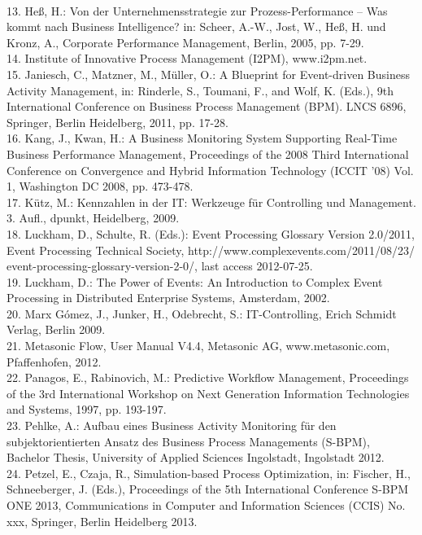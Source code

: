 \\
13.	Heß, H.: Von der Unternehmensstrategie zur Prozess-Performance – Was kommt nach Business Intelligence? in: Scheer, A.-W., Jost, W., Heß, H. und Kronz, A., Corporate Performance Management, Berlin, 2005, pp. 7-29.
\\
14.	Institute of Innovative Process Management (I2PM), www.i2pm.net.
\\
15.	Janiesch, C., Matzner, M., Müller, O.: A Blueprint for Event-driven Business Activity Management, in: Rinderle, S., Toumani, F., and Wolf, K. (Eds.), 9th International Conference on Business Process Management (BPM). LNCS 6896, Springer, Berlin Heidelberg, 2011, pp. 17-28.
\\
16.	Kang, J., Kwan, H.: A Business Monitoring System Supporting Real-Time Business Performance Management, Proceedings of the 2008 Third International Conference on Convergence and Hybrid Information Technology (ICCIT '08) Vol. 1, Washington DC 2008, pp. 473-478.
\\
17.	Kütz, M.: Kennzahlen in der IT: Werkzeuge für Controlling und Management. 3. Aufl., dpunkt, Heidelberg, 2009.
\\
18.	Luckham, D., Schulte, R. (Eds.): Event Processing Glossary Version 2.0/2011, Event Processing Technical Society, http://www.complexevents.com/2011/08/23/ event-processing-glossary-version-2-0/, last access 2012-07-25.
\\
19.	Luckham, D.: The Power of Events: An Introduction to Complex Event Processing in Distributed Enterprise Systems, Amsterdam, 2002.
\\
20.	Marx Gómez, J., Junker, H., Odebrecht, S.: IT-Controlling, Erich Schmidt Verlag, Berlin 2009.
\\
21.	Metasonic Flow, User Manual V4.4, Metasonic AG, www.metasonic.com, Pfaffenhofen, 2012.
\\
22.	Panagos, E., Rabinovich, M.: Predictive Workflow Management, Proceedings of the 3rd International Workshop on Next Generation Information Technologies and Systems, 1997, pp. 193-197.
\\
23.	Pehlke, A.: Aufbau eines Business Activity Monitoring für den subjektorientierten Ansatz des Business Process Managements (S-BPM), Bachelor Thesis, University of Applied Sciences Ingolstadt, Ingolstadt 2012.
\\
24.	Petzel, E., Czaja, R., Simulation-based Process Optimization, in: Fischer, H., Schneeberger, J. (Eds.), Proceedings of the 5th International Conference S-BPM ONE 2013, Communications in Computer and Information Sciences (CCIS) No. xxx, Springer, Berlin Heidelberg 2013.
